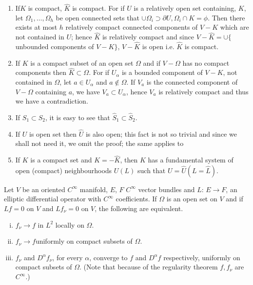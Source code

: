 \begin{remarks*}%
  \begin{enumerate}[(1)]
  \item If\pageoriginale $K$ is compact, $\hat{K}$ is compact. For if $U$ is a
    relatively open set containing, $K$, let $\Omega_1, \ldots ,
    \Omega_h$ be open connected sets that $\cup \Omega _i \supset
    \partial U, \Omega_i \cap K = \phi$. Then there exists at most $h$
    relatively compact connected components of $V-K$ which are not
    contained in $U$; hence $\hat{K}$ is relatively compact and since $V -
    \hat{K} = \cup \{$ unbounded components  of $V-K \}$, $V - \hat{K}$
    is open i.e. $\hat{K}$ is compact. 
  \item If $K$ is a compact subset of an open set $\Omega$ and if $V-
    \Omega$ has no compact components then $\hat{K} \subset
    \Omega$. For if $U_{\alpha}$ is a bounded component of $V-K$, not
    contained in $\Omega$, let $a \in U_{\alpha}$ and $a \not\in
    \Omega$. If $V_a$ is the connected component of $V - \Omega$
    containing $a$, we have $V_a \subset U_{\alpha}$, hence $V_a$ is
    relatively compact and thus we have a contradiction. 
  \item If $S_1 \subset S_2$, it is easy to see that $\hat{S}_1
    \subset \hat{S}_2$. 
  \item If $U$ is open set then $\hat{U}$ is also open; this fact is
    not so trivial and since we shall not  need it, we omit the proof;
    the same applies to 
  \item If $K$ is a compact set and $K = - \hat{K}$, then $K$ has a
    fundamental system of open (compact) neighbourhoods $U(L)$ such
    that $U = \hat{U} (L = \hat{L})$. 
  \end{enumerate}
\end{remarks*}

\setcounter{lemma}{0}
\begin{lemma}\label{chap3:sec10:lem1}%
  Let $V$ be an oriented $C^{\infty}$ manifold, $E$, $F$ $C^{\infty}$
  vector bundles and $L$: $E \to F$, an elliptic differential operator
  with $C^{\infty}$ coefficients. If $\Omega$ is an open set on $V$
  and if $Lf= 0$ on $V$ and $Lf_{\nu} =0$ on $V$, the following
  are equivalent. 
  \begin{enumerate}[(i)]
  \item $f_{\nu} \to f$ in $L^2$ locally on $\Omega$.
  \item $f_{\nu} \to f$\pageoriginale uniformly on compact subsets of $\Omega$.
  \item $f_{\nu}$ and $D^{\alpha} f_{\nu}$, for every $\alpha$,
    converge to $f$ and $D^{\alpha} f$ respectively, uniformly on
    compact subsets of $\Omega$. (Note that because of the regularity
    theorem $f, f_{\nu}$ are $C^{\infty}$.) 
  \end{enumerate}
\end{lemma}

